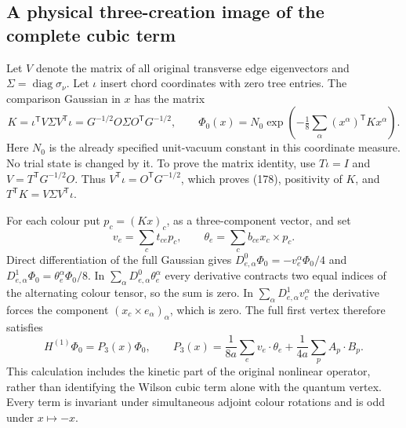 \documentclass[11pt]{article}
\begin{document}
\subsection{A physical three-creation image of the complete cubic term}

Let $V$ denote the matrix of all original transverse edge eigenvectors
and $\Sigma=\operatorname{diag}\sigma_\nu$. Let $\iota$ insert chord
coordinates with zero tree entries. The comparison Gaussian in $x$
has the matrix
\begin{equation}\label{eq:vertex-K}
 K=\iota^{\mathsf T}V\Sigma V^{\mathsf T}\iota
   =G^{-1/2}O\Sigma O^{\mathsf T}G^{-1/2},\qquad
 \Phi_0(x)=N_0\exp\left(-\tfrac18\sum_\alpha(x^\alpha)^{\mathsf T}Kx^\alpha\right).
\end{equation}
Here $N_0$ is the already specified unit-vacuum constant in this
coordinate measure. No trial state is changed by it. To prove the
matrix identity, use $T\iota=I$ and
$V=T^{\mathsf T}G^{-1/2}O$. Thus
$V^{\mathsf T}\iota=O^{\mathsf T}G^{-1/2}$, which proves
(178), positivity of $K$, and
$T^{\mathsf T}K=V\Sigma V^{\mathsf T}\iota$.

For each colour put $p_c=(Kx)_c$, as a three-component vector,
and set
\[
 v_e=\sum_c t_{ce}p_c,\qquad
 \theta_e=\sum_c b_{ce}x_c\times p_c.
\]
Direct differentiation of the full Gaussian gives
$D^0_{e,\alpha}\Phi_0=-v_e^\alpha\Phi_0/4$ and
$D^1_{e,\alpha}\Phi_0=\theta_e^\alpha\Phi_0/8$.
In $\sum_\alpha D^0_{e,\alpha}\theta_e^\alpha$ every derivative
contracts two equal indices of the alternating colour tensor, so
the sum is zero. In $\sum_\alpha D^1_{e,\alpha}v_e^\alpha$ the
derivative forces the component $(x_c\times e_\alpha)_\alpha$,
which is zero. The full first vertex therefore satisfies
\begin{equation}\label{eq:vertex-cubic-polynomial}
 H^{(1)}\Phi_0=P_3(x)\Phi_0,\qquad
 P_3(x)=\frac1{8a}\sum_e v_e\cdot\theta_e
                      +\frac1{4a}\sum_p A_p\cdot B_p.
\end{equation}
This calculation includes the kinetic part of the original nonlinear
operator, rather than identifying the Wilson cubic term alone with
the quantum vertex. Every term is invariant under simultaneous
adjoint colour rotations and is odd under $x\mapsto-x$.
\end{document}
